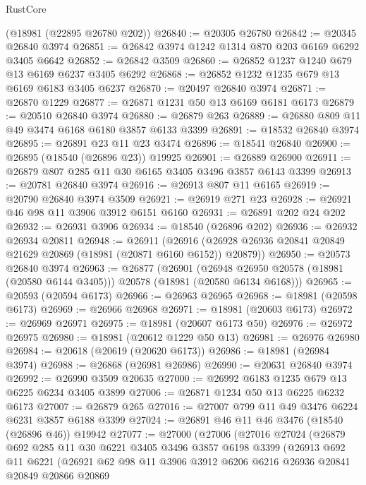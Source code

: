 \begin{lexlean}{RustCore}
\begin{coremodule}
    (@18981 (@22895 @26780 @202))
@26840 := @20305 @26780
@26842 := @20345 @26840 @3974
@26851 := @26842 @3974 @1242 @1314 @870 @203 @6169 @6292 @3405 @6642
@26852 := @26842 @3509
@26860 := @26852 @1237 @1240 @679 @13 @6169 @6237 @3405 @6292
@26868 := @26852 @1232 @1235 @679 @13 @6169 @6183 @3405 @6237
@26870 := @20497 @26840 @3974
@26871 := @26870 @1229
@26877 := @26871 @1231 @50 @13 @6169 @6181 @6173
@26879 := @20510 @26840 @3974
@26880 := @26879 @263
@26889 := @26880 @809 @11 @49 @3474 @6168 @6180 @3857 @6133 @3399
@26891 := @18532 @26840 @3974
@26895 := @26891 @23 @11 @23 @3474
@26896 := @18541 @26840
@26900 := @26895 (@18540 (@26896 @23)) @19925
@26901 := @26889 @26900
@26911 := @26879 @807 @285 @11 @30 @6165 @3405 @3496 @3857 @6143 @3399
@26913 := @20781 @26840 @3974
@26916 := @26913 @807 @11 @6165
@26919 := @20790 @26840 @3974 @3509
@26921 := @26919 @271 @23
@26928 := @26921 @46 @98 @11 @3906 @3912 @6151 @6160
@26931 := @26891 @202 @24 @202
@26932 := @26931 @3906
@26934 := @18540 (@26896 @202)
@26936 := @26932 @26934 @20811
@26948 := @26911
    (@26916 (@26928 @26936 @20841 @20849 @21629 @20869 (@18981 (@20871 @6160 @6152)) @20879))
@26950 := @20573 @26840 @3974
@26963 := @26877
    (@26901
      (@26948 @26950 @20578 (@18981 (@20580 @6144 @3405)))
      @20578
      (@18981 (@20580 @6134 @6168)))
@26965 := @20593 (@20594 @6173)
@26966 := @26963 @26965
@26968 := @18981 (@20598 @6173)
@26969 := @26966 @26968
@26971 := @18981 (@20603 @6173)
@26972 := @26969 @26971
@26975 := @18981 (@20607 @6173 @50)
@26976 := @26972 @26975
@26980 := @18981 (@20612 @1229 @50 @13)
@26981 := @26976 @26980
@26984 := @20618 (@20619 (@20620 @6173))
@26986 := @18981 (@26984 @3974)
@26988 := @26868 (@26981 @26986)
@26990 := @20631 @26840 @3974
@26992 := @26990 @3509 @20635
@27000 := @26992 @6183 @1235 @679 @13 @6225 @6234 @3405 @3899
@27006 := @26871 @1234 @50 @13 @6225 @6232 @6173
@27007 := @26879 @265
@27016 := @27007 @799 @11 @49 @3476 @6224 @6231 @3857 @6188 @3399
@27024 := @26891 @46 @11 @46 @3476 (@18540 (@26896 @46)) @19942
@27077 := @27000
    (@27006
      (@27016
        @27024
        (@26879
          @692
          @285
          @11
          @30
          @6221
          @3405
          @3496
          @3857
          @6198
          @3399
          (@26913
            @692
            @11
            @6221
            (@26921
              @62
              @98
              @11
              @3906
              @3912
              @6206
              @6216
              @26936
              @20841
              @20849
              @20866
              @20869

\end{coremodule}
\end{lexlean}
